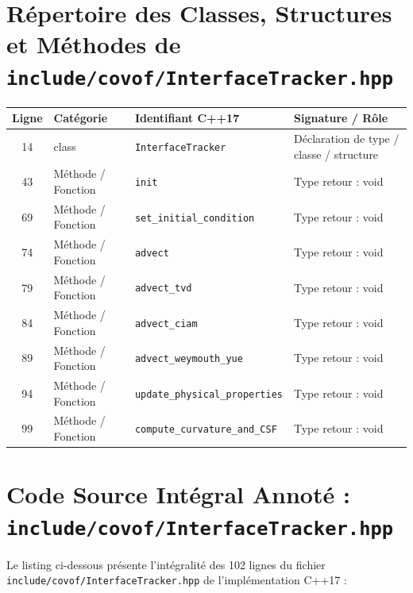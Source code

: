 \documentclass[10pt,a4paper,oneside]{book}
\begin{document}
\section{Répertoire des Classes, Structures et Méthodes de \texttt{include/covof/InterfaceTracker.hpp}}
\begin{center}\small
\begin{tabular}{clll}
\toprule
\textbf{Ligne} & \textbf{Catégorie} & \textbf{Identifiant C++17} & \textbf{Signature / Rôle} \\
\midrule
14 & class & \texttt{InterfaceTracker} & Déclaration de type / classe / structure \\
43 & Méthode / Fonction & \texttt{init} & Type retour : void \\
69 & Méthode / Fonction & \texttt{set\_initial\_condition} & Type retour : void \\
74 & Méthode / Fonction & \texttt{advect} & Type retour : void \\
79 & Méthode / Fonction & \texttt{advect\_tvd} & Type retour : void \\
84 & Méthode / Fonction & \texttt{advect\_ciam} & Type retour : void \\
89 & Méthode / Fonction & \texttt{advect\_weymouth\_yue} & Type retour : void \\
94 & Méthode / Fonction & \texttt{update\_physical\_properties} & Type retour : void \\
99 & Méthode / Fonction & \texttt{compute\_curvature\_and\_CSF} & Type retour : void \\
\bottomrule
\end{tabular}
\end{center}

\section{Code Source Intégral Annoté : \texttt{include/covof/InterfaceTracker.hpp}}
Le listing ci-dessous présente l'intégralité des 102 lignes du fichier \texttt{include/covof/InterfaceTracker.hpp} de l'implémentation C++17 :
\end{document}

